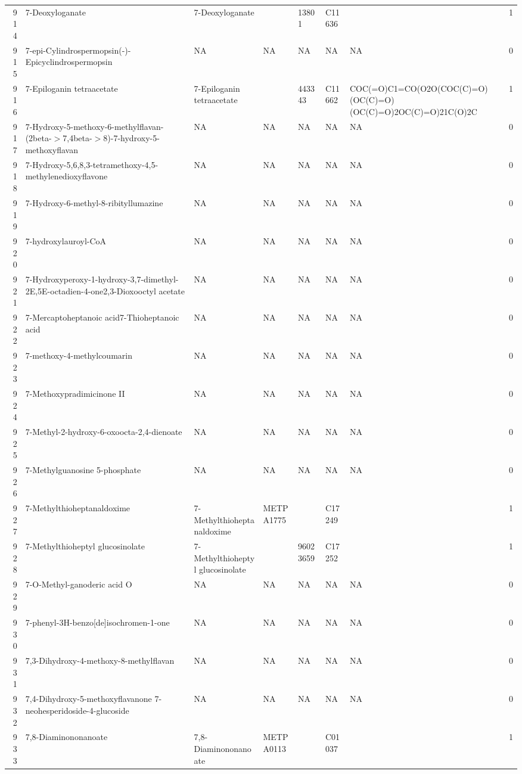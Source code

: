 \documentclass[a4paper]{article}
\begin{document}
\begin{longtable}{rlllllll}
  914 & 7-Deoxyloganate & 7-Deoxyloganate &  & 13801 & C11636 &  & 1 \\ 
  915 & 7-epi-Cylindrospermopsin(-)-Epicyclindrospermopsin & NA & NA & NA & NA & NA & 0 \\ 
  916 & 7-Epiloganin tetraacetate & 7-Epiloganin tetraacetate &  & 443343 & C11662 & COC(=O)C1=CO(O2O(COC(C)=O)(OC(C)=O)(OC(C)=O)2OC(C)=O)21C(O)2C & 1 \\ 
  917 & 7-Hydroxy-5-methoxy-6-methylflavan-(2beta-$>$7,4beta-$>$8)-7-hydroxy-5-methoxyflavan & NA & NA & NA & NA & NA & 0 \\ 
  918 & 7-Hydroxy-5,6,8,3-tetramethoxy-4,5-methylenedioxyflavone & NA & NA & NA & NA & NA & 0 \\ 
  919 & 7-Hydroxy-6-methyl-8-ribityllumazine & NA & NA & NA & NA & NA & 0 \\ 
  920 & 7-hydroxylauroyl-CoA & NA & NA & NA & NA & NA & 0 \\ 
  921 & 7-Hydroxyperoxy-1-hydroxy-3,7-dimethyl-2E,5E-octadien-4-one2,3-Dioxooctyl acetate & NA & NA & NA & NA & NA & 0 \\ 
  922 & 7-Mercaptoheptanoic acid7-Thioheptanoic acid & NA & NA & NA & NA & NA & 0 \\ 
  923 & 7-methoxy-4-methylcoumarin & NA & NA & NA & NA & NA & 0 \\ 
  924 & 7-Methoxypradimicinone II & NA & NA & NA & NA & NA & 0 \\ 
  925 & 7-Methyl-2-hydroxy-6-oxoocta-2,4-dienoate & NA & NA & NA & NA & NA & 0 \\ 
  926 & 7-Methylguanosine 5-phosphate & NA & NA & NA & NA & NA & 0 \\ 
  927 & 7-Methylthioheptanaldoxime & 7-Methylthioheptanaldoxime & METPA1775 &  & C17249 &  & 1 \\ 
  928 & 7-Methylthioheptyl glucosinolate & 7-Methylthioheptyl glucosinolate &  & 96023659 & C17252 &  & 1 \\ 
  929 & 7-O-Methyl-ganoderic acid O & NA & NA & NA & NA & NA & 0 \\ 
  930 & 7-phenyl-3H-benzo[de]isochromen-1-one & NA & NA & NA & NA & NA & 0 \\ 
  931 & 7,3-Dihydroxy-4-methoxy-8-methylflavan & NA & NA & NA & NA & NA & 0 \\ 
  932 & 7,4-Dihydroxy-5-methoxyflavanone 7-neohesperidoside-4-glucoside & NA & NA & NA & NA & NA & 0 \\ 
  933 & 7,8-Diaminononanoate & 7,8-Diaminononanoate & METPA0113 &  & C01037 &  & 1 \\ 

\end{longtable}
\end{document}
